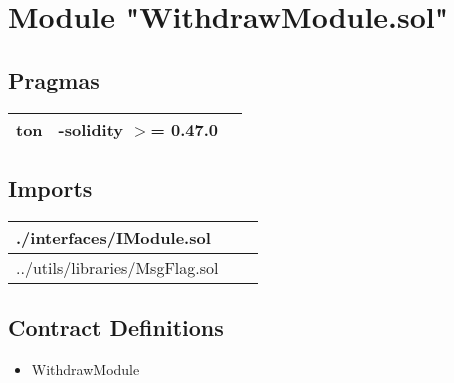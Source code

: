 
\section{Module "WithdrawModule.sol"}


\subsection{Pragmas}


\noindent\begin{tabular}{|l|l|p{5cm}|}\hline
ton & -solidity $>$= 0.47.0 &\\\hline
\end{tabular}


\subsection{Imports}


\noindent\begin{tabular}{|l|l|p{5cm}|}\hline
./interfaces/IModule.sol &\\\hline
../utils/libraries/MsgFlag.sol &\\\hline
\end{tabular}


\subsection{Contract Definitions}

\begin{itemize}
\item WithdrawModule
\end{itemize}
